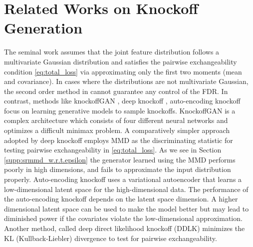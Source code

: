 \documentclass{article}
\theoremstyle{definition}
\begin{document}
\section{Related Works on Knockoff Generation}\label{supp:related_works_knockoffs}
The seminal work \cite{candes2016panning} assumes that the joint feature distribution follows a multivariate Gaussian distribution and satisfies the pairwise exchangeability condition \eqref{eq:total_loss} via approximating only the first two moments (mean and covariance). In cases where the distributions are not multivariate Gaussian, the second order method in \cite{candes2016panning} cannot guarantee any control of the FDR. In contrast, methods like knockoffGAN \cite{salimans2016improved}, deep knockoff \cite{romano2020deep}, auto-encoding knockoff \cite{liu2018auto} focus on learning generative models to sample knockoffs. KnockoffGAN is a complex architecture which consists of four different neural networks and optimizes a difficult minimax problem. A comparatively simpler approach adopted by deep knockoff employs MMD \cite{gretton2012kernel} as the discriminating statistic for testing pairwise exchangeability in \eqref{eq:total_loss}. As we see in Section \ref{supp:srmmd_w.r.t.epsilon} the generator learned using the MMD performs poorly in high dimensions, and fails to approximate the input distribution properly. Auto-encoding knockoff uses a variational autoencoder \cite{kingma2019introduction} that learns a low-dimensional latent space for the high-dimensional data. The performance of the auto-encoding knockoff depends on the latent space dimension. A higher dimensional latent space
can be used to make the model better but may lead to diminished power if the covariates violate the low-dimensional approximation. Another method, called deep direct likelihood knockoff (DDLK) \cite{sudarshan2020deep} minimizes the KL (Kullback-Liebler) divergence to test for pairwise exchangeability. 
\end{document}
